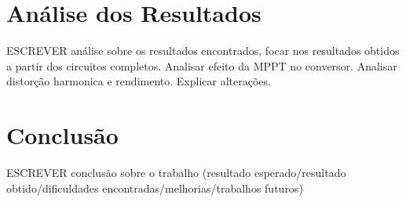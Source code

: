 \documentclass[
	12pt,				%
	openany,
	onseside,
	a4paper,			%
	english,			%
	french,				%
	spanish,			%
	brazil,				%
	]{abntex2}
\begin{document}
\begin{table}[H]
	\captionsetup{justification=centering}
	\centering
	\caption{Valores obtidos para o inversor cuk integrado unipolar}
	\label{tab:integ_unip_res}
\end{table}

\chapter{Análise dos Resultados}

ESCREVER análise sobre os resultados encontrados, focar nos resultados obtidos a partir dos circuitos completos. Analisar efeito da MPPT no conversor. Analisar distorção harmonica e rendimento. Explicar alterações.

\chapter{Conclusão}

ESCREVER conclusão sobre o trabalho (resultado esperado/resultado obtido/dificuldades encontradas/melhorias/trabalhos futuros)






% 
\end{document}

